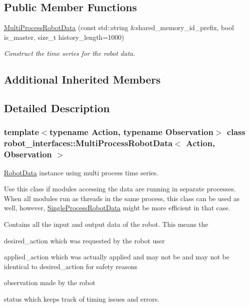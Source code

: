 \subsection*{Public Member Functions}
\begin{DoxyCompactItemize}
\item 
\hyperlink{classrobot__interfaces_1_1MultiProcessRobotData_a27bb5ee187ceacb386d89c828481b057}{Multi\+Process\+Robot\+Data} (const std\+::string \&shared\+\_\+memory\+\_\+id\+\_\+prefix, bool is\+\_\+master, size\+\_\+t history\+\_\+length=1000)
\begin{DoxyCompactList}\small\item\em Construct the time series for the robot data. \end{DoxyCompactList}\end{DoxyCompactItemize}
\subsection*{Additional Inherited Members}


\subsection{Detailed Description}
\subsubsection*{template$<$typename Action, typename Observation$>$\newline
class robot\+\_\+interfaces\+::\+Multi\+Process\+Robot\+Data$<$ Action, Observation $>$}

\hyperlink{classrobot__interfaces_1_1RobotData}{Robot\+Data} instance using multi process time series. 

Use this class if modules accessing the data are running in separate processes. When all modules run as threads in the same process, this class can be used as well, however, \hyperlink{classrobot__interfaces_1_1SingleProcessRobotData}{Single\+Process\+Robot\+Data} might be more efficient in that case.

Contains all the input and output data of the robot. This means the
\begin{DoxyItemize}
\item {\ttfamily desired\+\_\+action} which was requested by the robot user
\item {\ttfamily applied\+\_\+action} which was actually applied and may not be and may not be identical to desired\+\_\+action for safety reasons
\item {\ttfamily observation} made by the robot
\item {\ttfamily status} which keeps track of timing issues and errors.
\end{DoxyItemize}

